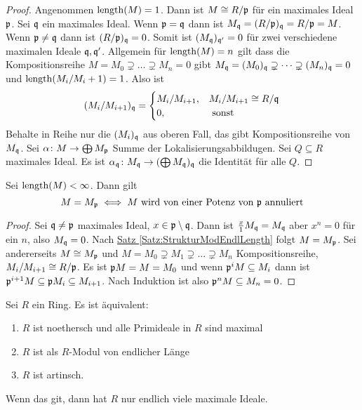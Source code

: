 \begin{proof}
    Angenommen \(\operatorname{length}(M)=1\). Dann ist \(M\cong R/\mathfrak{p}\) für ein maximales Ideal \(\mathfrak{p}\). Sei \(\mathfrak{q}\) ein maximales Ideal. Wenn \(\mathfrak{p}=\mathfrak{q}\) dann ist \(M_{\mathfrak{q}}=(R/\mathfrak{p})_{\mathfrak{q}}=R/\mathfrak{p}=M\).
    Wenn \(\mathfrak{p}\neq\mathfrak{q}\) dann ist \((R/\mathfrak{p})_{\mathfrak{q}}=0\). Somit ist \((M_{\mathfrak{q}})_{\mathfrak{q}'}=0\) für zwei verschiedene maximalen Ideale \(\mathfrak{q},\mathfrak{q}'\). Allgemein für \(\operatorname{length}(M)=n\) gilt dass die Kompositionsreihe \(M=M_0\supsetneq \dots\supsetneq M_n=0\) gibt \(M_{\mathfrak{q}}=(M_0)_{\mathfrak{q}}\supsetneq \dots\supsetneq (M_n)_{\mathfrak{q}}=0\) und \(\operatorname{length}(M_i/M_i+1)=1\). Also ist 
    $$(M_i/M_{i+1})_{\mathfrak{q}}=\begin{cases}
        M_i/M_{i+1}, & M_i/M_{i+1}\cong R/\mathfrak{q}\\
        0 , &\text{ sonst}
    \end{cases}$$
    Behalte in Reihe nur die \((M_i)_{\mathfrak{q}}\) aus oberen Fall, das gibt Kompositionsreihe von \(M_{\mathfrak{q}}\).
    Sei \(\alpha\colon M\to \bigoplus M_{\mathfrak{p}}\) Summe der Lokalisierungsabbildugen. Sei \(Q\subseteq R\) maximales Ideal. Es ist \(\alpha_{\mathfrak{q}}\colon M_{\mathfrak{q}}\to (\bigoplus M_{\mathfrak{q}})_{\mathfrak{q}}\) die Identität für alle \(Q\).
\end{proof}
\begin{Satz}
    Sei \(\operatorname{length}(M)<\infty\). Dann gilt
    \[M=M_{\mathfrak{p}}\iff M\text{ wird von einer Potenz von \(\mathfrak{p}\) annuliert}\]
\end{Satz}
\begin{proof}
    Sei \(\mathfrak{q}\neq\mathfrak{p}\) maximales Ideal, \(x\in\mathfrak{p}\setminus\mathfrak{q}\). Dann ist \(\frac x 1 M_{\mathfrak{q}}=M_{\mathfrak{q}}\) aber \(x^n=0\) für ein \(n\), also \(M_{\mathfrak{q}}=0\).
    Nach \hyperref[Satz:StrukturModEndlLength]{ Satz \ref{Satz:StrukturModEndlLength}} folgt \(M=M_{\mathfrak{p}}\).
    Sei andererseits \(M\cong M_{\mathfrak{p}}\) und \(M=M_0\supsetneq M_1\supsetneq \dots \supsetneq M_n\) Kompositionsreihe, \(M_i/M_{i+1}\cong R/\mathfrak{p}\). Es ist \(\mathfrak{p} M=M=M_0\) und wenn \(\mathfrak{p}^iM\subseteq M_i\) dann ist \(\mathfrak{p}^{i+1}M\subseteq \mathfrak{p} M_i\subseteq M_{i+1}\). Nach Induktion ist also \(\mathfrak{p}^nM\subseteq M_n=0\).
\end{proof}
\begin{Satz}\label{Satz:ArtinRingEndlLen}
    Sei \(R\) ein Ring. Es ist äquivalent:
    \begin{enumerate}
        \item \(R\) ist noethersch und alle Primideale in \(R\) sind maximal
        \item \(R\) ist als \(R\)-Modul von endlicher Länge
        \item \(R\) ist artinsch.
    \end{enumerate}
    Wenn das git, dann hat \(R\) nur endlich viele maximale Ideale.
\end{Satz}
